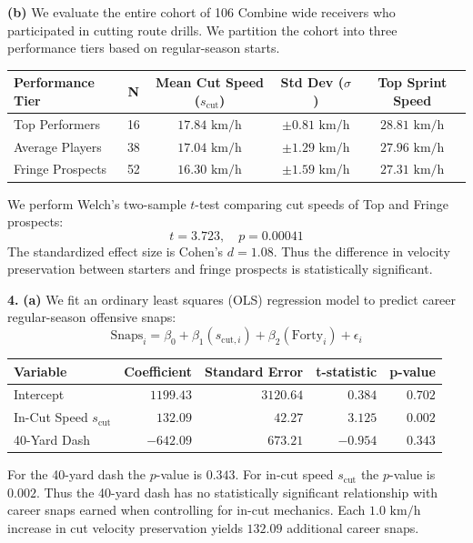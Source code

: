 \documentclass[11pt]{article}
\begin{document}
\noindent\textbf{(b)}
We evaluate the entire cohort of 106 Combine wide receivers who participated in cutting route drills. We partition the cohort into three performance tiers based on regular-season starts.

\begin{center}
\small
\begin{tabular}{lcccc}
\toprule
\textbf{Performance Tier} & \textbf{N} & \textbf{Mean Cut Speed ($s_{\text{cut}}$)} & \textbf{Std Dev ($\sigma$)} & \textbf{Top Sprint Speed} \\
\midrule
Top Performers & 16 & $17.84 \text{ km/h}$ & $\pm 0.81 \text{ km/h}$ & $28.81 \text{ km/h}$ \\
Average Players & 38 & $17.04 \text{ km/h}$ & $\pm 1.29 \text{ km/h}$ & $27.96 \text{ km/h}$ \\
Fringe Prospects & 52 & $16.30 \text{ km/h}$ & $\pm 1.59 \text{ km/h}$ & $27.31 \text{ km/h}$ \\
\bottomrule
\end{tabular}
\end{center}

We perform Welch's two-sample $t$-test comparing cut speeds of Top and Fringe prospects:
\[ t = 3.723, \quad p = 0.00041 \]
The standardized effect size is Cohen's $d = 1.08$. Thus the difference in velocity preservation between starters and fringe prospects is statistically significant.

\noindent\textbf{4.}
\noindent\textbf{(a)}
We fit an ordinary least squares (OLS) regression model to predict career regular-season offensive snaps:
\[ \text{Snaps}_i = \beta_0 + \beta_1 (s_{\text{cut}, i}) + \beta_2 (\text{Forty}_i) + \epsilon_i \]

\begin{center}
\small
\begin{tabular}{lrrrr}
\toprule
\textbf{Variable} & \textbf{Coefficient} & \textbf{Standard Error} & \textbf{t-statistic} & \textbf{p-value} \\
\midrule
Intercept & $1199.43$ & $3120.64$ & $0.384$ & $0.702$ \\
In-Cut Speed $s_{\text{cut}}$ & $132.09$ & $42.27$ & $3.125$ & $0.002$ \\
40-Yard Dash & $-642.09$ & $673.21$ & $-0.954$ & $0.343$ \\
\bottomrule
\end{tabular}
\end{center}

For the 40-yard dash the $p$-value is $0.343$. For in-cut speed $s_{\text{cut}}$ the $p$-value is $0.002$. Thus the 40-yard dash has no statistically significant relationship with career snaps earned when controlling for in-cut mechanics. Each $1.0 \text{ km/h}$ increase in cut velocity preservation yields $132.09$ additional career snaps.
\end{document}
